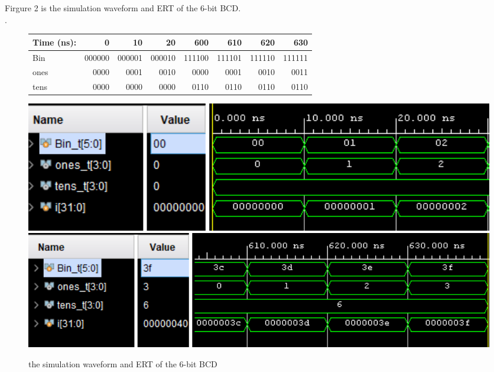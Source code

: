 \documentclass[11pt]{article}
\begin{document}
	Firgure 2 is the simulation waveform and ERT of the 6-bit BCD.\\
	.\\
	\begin{figure}[ht]\centering
		\begin{tabular}{l|rrr|rrrr}
			Time (ns): & 0 & 10 & 20 & 600 & 610 & 620 & 630 \\
			\midrule
			Bin & 000000 & 000001 & 000010 & 111100 & 111101 & 111110 & 111111 \\
			\midrule
			ones & 0000 & 0001 & 0010 & 0000 & 0001 & 0010 & 0011 \\
			tens & 0000 & 0000 & 0000 & 0110 & 0110 & 0110 & 0110 \\
			\bottomrule
		\end{tabular}\medskip
		
		\includegraphics[width=1\textwidth]{bcd6_simulate_beginning}
		\includegraphics[width=1\textwidth]{bcd6_simulate_end}
		\caption{the simulation waveform and ERT of the 6-bit BCD}
		\label{fig:bcd6_simulate}
	\end{figure}
	
\end{document}
